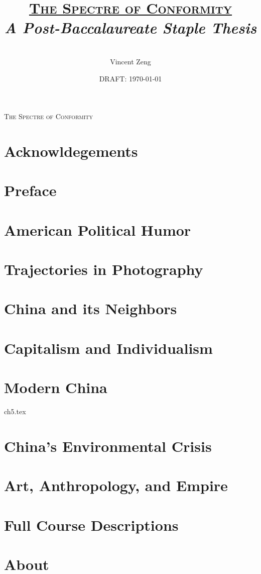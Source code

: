 \documentclass[12pt,twoside,openany]{book}
\title{\Huge\textsc{\underline{The Spectre of Conformity}}\\
\null
\Large{\textit{A Post-Baccalaureate Staple Thesis}}}
\author{\null\\
Vincent Zeng}
\date{DRAFT: \today}
\begin{document}
\thispagestyle{empty}

\begin{center}
    \Huge\textsc{The Spectre of Conformity}{\Huge}
\end{center}



\maketitle

\blankpage

\frontmatter
\chapter{Acknowldegements}


\tableofcontents

\blankpage

\chapter{Preface}
\null
\null
\null


\blankpage
\blankpage

\mainmatter

\chapter{American Political Humor}


\chapter{Trajectories in Photography}


\chapter{China and its Neighbors}


\chapter{Capitalism and Individualism}


\chapter{Modern China}
 {ch5.tex}

\chapter{China's Environmental Crisis}


\chapter{Art, Anthropology, and Empire}


\appendix

\chapter{Full Course Descriptions}


\blankpage
\blankpage
\blankpage
\chapter*{About}

\end{document}
